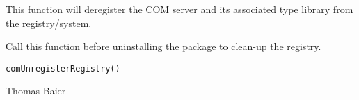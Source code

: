 \begin{Description}\relax
This function will deregister the COM server and its associated type library
from the registry/system.

Call this function before uninstalling the package to clean-up the registry.
\end{Description}
\begin{Usage}
\begin{verbatim}
comUnregisterRegistry()
\end{verbatim}
\end{Usage}
\begin{Arguments}
\end{Arguments}
\begin{Author}\relax
Thomas Baier
\end{Author}
\begin{SeeAlso}\relax
{}
\end{SeeAlso}

